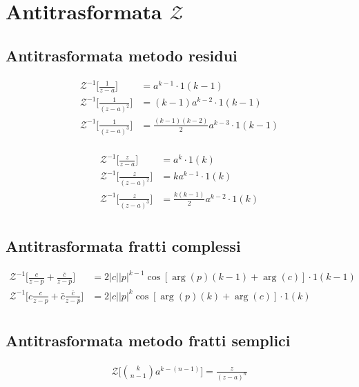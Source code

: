 \chapter{Antitrasformata $\mathcal{Z}$}


\section{Antitrasformata metodo residui}
\begin{align}
  \mathcal{Z}^{-1}\Bigg[\frac{1}{z-a}\Bigg] &= a^{k-1} \cdot 1(k-1) \\
  \mathcal{Z}^{-1}\Bigg[ \frac{1}{(z-a)^2} \Bigg] &= (k-1) a^{k-2} \cdot 1(k-1) \\
  \mathcal{Z}^{-1}\Bigg[ \frac{1}{(z-a)^3} \Bigg] &= \frac{(k-1)(k-2)}{2} a^{k-3} \cdot 1(k-1) \\
\end{align}

\begin{align}
  \mathcal{Z}^{-1}\Bigg[\frac{z}{z-a}\Bigg] &= a^k \cdot 1(k) \\
  \mathcal{Z}^{-1}\Bigg[\frac{z}{(z-a)^2}\Bigg] &= k a^{k-1} \cdot 1(k) \\
  \mathcal{Z}^{-1}\Bigg[\frac{z}{(z-a)^3}\Bigg] &= \frac{k(k-1)}{2} a^{k-2} \cdot 1(k) \\
\end{align}


\section{Antitrasformata fratti complessi}

\begin{align}
  \mathcal{Z}^{-1}\Bigg[ \frac{c}{z-p} + \frac{\bar{c}}{z-\bar{p}} \Bigg] &= 2 | c | | p |^{k-1} \cos [ \arg(p) (k-1) + \arg(c) ] \cdot 1(k-1) \\
  \mathcal{Z}^{-1}\Bigg[ c\frac{c}{z-p} + \bar{c}\frac{\bar{c}}{z-\bar{p}} \Bigg] &= 2 | c | | p |^{k} \cos [ \arg(p) (k) + \arg(c) ] \cdot 1(k) \\
\end{align}


\section{Antitrasformata metodo fratti semplici}
\begin{align}
  \mathcal{Z}\Bigg[\binom{k}{n-1} a^{k-(n-1)}\Bigg] = \frac{z}{(z-a)^n}
\end{align}

